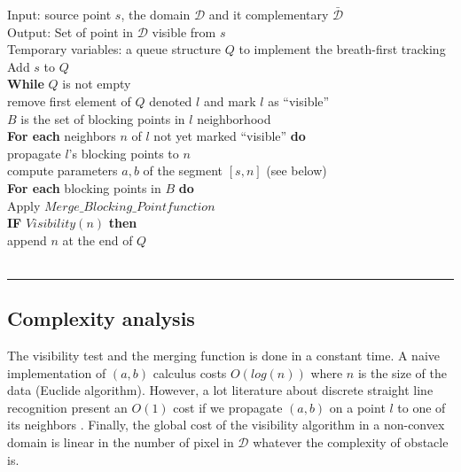 \documentclass{llncs}
\begin{document}
\noindent \textsf{Input: source point $s$, the domain $\mathcal{D}$ and it complementary $\bar{\mathcal{D}}$\\
\noindent Output: Set of point in $\mathcal{D}$ visible from $s$\\
\noindent Temporary variables: a queue structure $Q$ to implement the breath-first tracking\\
\hspace*{0.5cm} Add $s$ to $Q$\\
\hspace*{0.5cm} {\bf While} $Q$ is not empty\\
\hspace*{1cm} remove first element of $Q$ denoted $l$ and mark $l$ as ``visible''\\
\hspace*{1cm} $B$ is the set of blocking points in $l$ neighborhood\\
\hspace*{1cm} {\bf For each} neighbors $n$ of $l$ not yet marked ``visible'' {\bf do}\\
\hspace*{1.5cm} propagate $l$'s blocking points to $n$\\
\hspace*{1.5cm} compute parameters $a,b$ of the segment $[s,n]$ (see below)\\
\hspace*{1.5cm} {\bf For each} blocking points in $B$ {\bf do}\\
\hspace*{2cm} Apply $Merge\_Blocking\_Point function$\\
\hspace*{1.5cm} {\bf IF} $Visibility(n)$ {\bf then}\\
\hspace*{2cm} append $n$ at the end of $Q$\\
\hspace*{0.5cm}{\bf EndWhile}
}\\
\hrule
\normalsize


\subsection{Complexity analysis}

The visibility test and the merging function is done in a constant time. A naive
implementation of $(a,b)$ calculus costs $O(log(n))$ where $n$ is the size of the data (Euclide
algorithm). However, a lot literature about discrete straight line recognition present an $O(1)$
cost if we propagate $(a,b)$ on a point $l$ to one of its neighbors
\cite{debled,dorst,bruckstein,mcillroy}. Finally, the global cost of the visibility algorithm in a
non-convex domain is linear in the number of pixel in $\mathcal{D}$ whatever the complexity of obstacle is.
\end{document}
